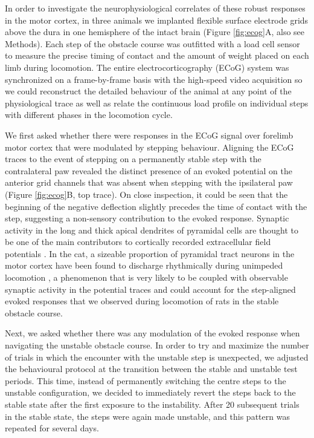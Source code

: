 In order to investigate the neurophysiological correlates of these robust responses in the motor cortex, in three animals we implanted flexible surface electrode grids above the dura in one hemisphere of the intact brain (Figure \ref{fig:ecog}A, also see Methods). Each step of the obstacle course was outfitted with a load cell sensor to measure the precise timing of contact and the amount of weight placed on each limb during locomotion. The entire electrocorticography (ECoG) system was synchronized on a frame-by-frame basis with the high-speed video acquisition so we could reconstruct the detailed behaviour of the animal at any point of the physiological trace as well as relate the continuous load profile on individual steps with different phases in the locomotion cycle.

We first asked whether there were responses in the ECoG signal over forelimb motor cortex that were modulated by stepping behaviour. Aligning the ECoG traces to the event of stepping on a permanently stable step with the contralateral paw revealed the distinct presence of an evoked potential on the anterior grid channels that was absent when stepping with the ipsilateral paw (Figure \ref{fig:ecog}B, top trace). On close inspection, it could be seen that the beginning of the negative deflection slightly precedes the time of contact with the step, suggesting a non-sensory contribution to the evoked response. Synaptic activity in the long and thick apical dendrites of pyramidal cells are thought to be one of the main contributors to cortically recorded extracellular field potentials \citep{Buzsaki2012}. In the cat, a sizeable proportion of pyramidal tract neurons in the motor cortex have been found to discharge rhythmically during unimpeded locomotion \citep{Armstrong1984a,Drew1996}, a phenomenon that is very likely to be coupled with observable synaptic activity in the potential traces and could account for the step-aligned evoked responses that we observed during locomotion of rats in the stable obstacle course.

Next, we asked whether there was any modulation of the evoked response when navigating the unstable obstacle course. In order to try and maximize the number of trials in which the encounter with the unstable step is unexpected, we adjusted the behavioural protocol at the transition between the stable and unstable test periods. This time, instead of permanently switching the centre steps to the unstable configuration, we decided to immediately revert the steps back to the stable state after the first exposure to the instability. After 20 subsequent trials in the stable state, the steps were again made unstable, and this pattern was repeated for several days.


